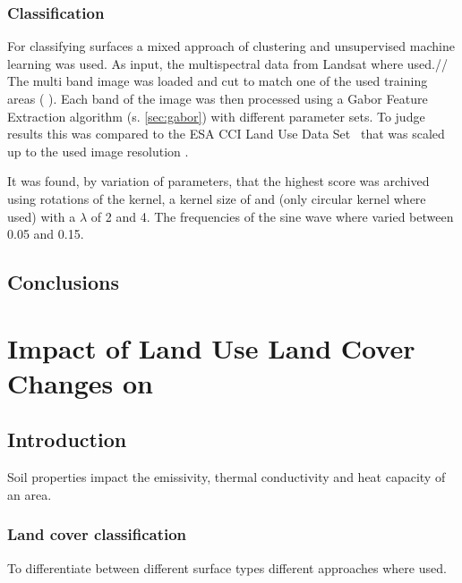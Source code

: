 \documentclass[a4paper, english]{article}
\begin{document}
    \subsubsection{Classification }\label{sec:classification}
    For classifying surfaces a mixed approach of clustering and unsupervised machine learning was used. 
    As input, the multispectral data from Landsat where used.// 
    The multi band image was loaded and cut to match one of the used training areas (%
). 
    Each band of the image was then processed using a Gabor Feature Extraction algorithm (s. \cref{sec:gabor}) with different parameter sets. 
    To judge results this was compared to the ESA CCI Land Use Data Set~\cite{landformclassicationusingfuzzykmeans2000} that was scaled up to the used image resolution . %

    It was found, by variation of parameters, that the highest score was archived using 
    rotations of the kernel, a kernel size of 
    and (only circular kernel where used) with a $\lambda$ of 2 and 4. %
    The frequencies of the sine wave where varied between 0.05 and 0.15. 


    \subsection{Conclusions}
    
    \section{Impact of Land Use Land Cover Changes on \texorpdfstring{}{Urban Heat Islands}}\label{sec:LULC}
    \subsection{Introduction}
    Soil properties impact the emissivity, thermal conductivity and heat capacity of an area.

    \subsubsection{Land cover classification}
    To differentiate between different surface types different approaches where used. 
    
\end{document}
